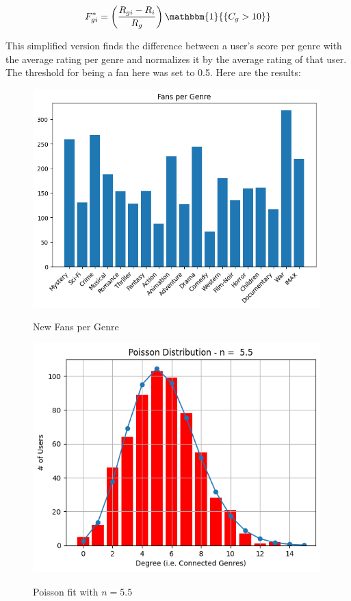 \documentclass[12pt]{article}
\numberwithin{equation}{section}
\begin{document}
\[
F_{gi}^* = \left(\frac{R_{gi} - R_i}{R_g}\right)\mathbbm{1}{\{C_g > 10\}}
\]

This simplified version finds the difference between a user's score per genre with the average rating per genre and normalizes it by the average rating of that user. The threshold for being a fan here was set to 0.5. Here are the results:

\begin{figure}[h!]
    \begin{minipage}[b]{0.5\linewidth}
         \centering
  	\includegraphics[width=0.99\textwidth]{fansgenre1.png}
  	\label{fig:fanspergenre}
	 \caption{New Fans per Genre}
    \end{minipage} 
    \hspace{0.1cm}
    \begin{minipage}[b]{0.5\linewidth}
         \centering
  	\includegraphics[width=0.99\textwidth]{poissondegree.png}
  	\label{fig:fanspergenre}
	 \caption{Poisson fit with $n = 5.5$}
    \end{minipage} 
\end{figure}
\end{document}

